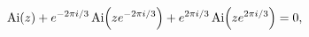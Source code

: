 \[\mathop{\mathrm{Ai}\/}\nolimits\!\left(z\right)+e^{-2\pi i/3}\mathop{\mathrm{%
Ai}\/}\nolimits\!\left(ze^{-2\pi i/3}\right)+e^{2\pi i/3}\mathop{\mathrm{Ai}\/%
}\nolimits\!\left(ze^{2\pi i/3}\right)=0,\]